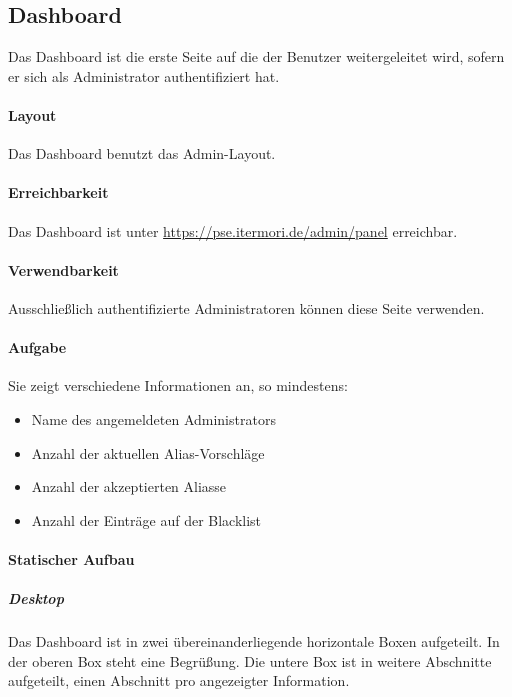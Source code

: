 \newpage
\subsection{Dashboard}

Das Dashboard ist die erste Seite auf die der Benutzer weitergeleitet wird, sofern er sich als Administrator authentifiziert hat.

\paragraph*{Layout}
Das Dashboard benutzt das Admin-Layout.

\paragraph*{Erreichbarkeit}
Das Dashboard ist unter \href{https://pse.itermori.de/admin/panel}{https://pse.itermori.de/admin/panel} erreichbar.

\paragraph*{Verwendbarkeit}
Ausschließlich authentifizierte Administratoren können diese Seite verwenden.

\paragraph*{Aufgabe}
Sie zeigt verschiedene Informationen an, so mindestens:

\begin{itemize}
    \item Name des angemeldeten Administrators
    \item Anzahl der aktuellen Alias-Vorschläge
    \item Anzahl der akzeptierten Aliasse
    \item Anzahl der Einträge auf der Blacklist
\end{itemize}

\paragraph*{Statischer Aufbau}
\subparagraph*{Desktop}
Das Dashboard ist in zwei übereinanderliegende horizontale Boxen aufgeteilt.
In der oberen Box steht eine Begrüßung.
Die untere Box ist in weitere Abschnitte aufgeteilt, einen Abschnitt pro angezeigter Information.

\begin{center}
    \captionsetup[figure]{labelformat=empty}
    \captionsetup[figure]{labelformat=default}
\end{center}

